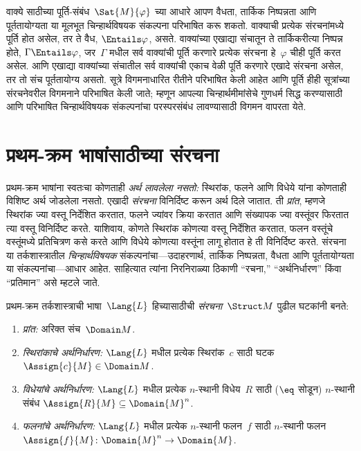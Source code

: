 वाक्ये साठीच्या पूर्ति-संबंध~$\Sat{M}{\varphi}$ च्या आधारे आपण वैधता,
तार्किक निष्पन्नता आणि पूर्ततायोग्यता या मूलभूत चिन्हार्थविषयक संकल्पना
परिभाषित करू शकतो. वाक्याची प्रत्येक संरचनांमध्ये पूर्ति
होत असेल, तर ते वैध, $\Entails \varphi$, असते. वाक्यांच्या एखाद्या
संचातून ते तार्किकरीत्या निष्पन्न होते, $\Gamma \Entails \varphi$, जर~$\Gamma$ मधील
सर्व वाक्यांची पूर्ति करणारे प्रत्येक संरचना हे~$\varphi$ चीही
पूर्ति करत असेल. आणि एखाद्या वाक्यांच्या संचातील सर्व
वाक्यांची एकाच वेळी पूर्ति करणारे एखादे संरचना असेल, तर तो
संच पूर्ततायोग्य असतो. सूत्रे विगमनाधारित रीतीने परिभाषित केली आहेत
आणि पूर्ति हीही सूत्रांच्या संरचनेवरील विगमनाने परिभाषित केली जाते;
म्हणून आपल्या चिन्हार्थमीमांसेचे गुणधर्म सिद्ध करण्यासाठी आणि परिभाषित
चिन्हार्थविषयक संकल्पनांचा परस्परसंबंध लावण्यासाठी विगमन वापरता येते.












\section{प्रथम-क्रम भाषांसाठीच्या संरचना}\label{fol:syn:str:sec}

\begin{explain}
प्रथम-क्रम भाषांना स्वतःचा कोणताही \emph{अर्थ लावलेला नसतो:}
स्थिरांक, फलने आणि विधेये यांना कोणताही विशिष्ट
अर्थ जोडलेला नसतो. एखादी \emph{संरचना}
विनिर्दिष्ट करून अर्थ दिले जातात. ती \emph{प्रांत}, म्हणजे
स्थिरांक ज्या वस्तू निर्देशित करतात, फलने ज्यांवर क्रिया
करतात आणि संख्यापक ज्या वस्तूंवर फिरतात त्या वस्तू विनिर्दिष्ट करते.
याशिवाय, कोणते स्थिरांक कोणत्या वस्तू निर्देशित करतात,
फलन वस्तूंचे वस्तूंमध्ये प्रतिचित्रण कसे करते आणि विधेये
कोणत्या वस्तूंना लागू होतात हे ती विनिर्दिष्ट करते. संरचना या
तर्कशास्त्रातील \emph{चिन्हार्थविषयक} संकल्पनांचा---उदाहरणार्थ, तार्किक
निष्पन्नता, वैधता आणि पूर्ततायोग्यता या संकल्पनांचा---आधार आहेत. साहित्यात त्यांना
निरनिराळ्या ठिकाणी ``रचना,'' ``अर्थनिर्धारण'' किंवा ``प्रतिमान'' असे
म्हटले जाते.
\end{explain}

\begin{defn}[संरचना]
प्रथम-क्रम तर्कशास्त्राची भाषा~$\Lang{L}$ हिच्यासाठीची
\emph{संरचना}~$\Struct M$ पुढील घटकांनी बनते:
\begin{enumerate}
\item \emph{प्रांत:} अरिक्त संच~$\Domain M$.
\item \emph{स्थिरांकाचे अर्थनिर्धारण:} $\Lang{L}$ मधील प्रत्येक
  स्थिरांक~$c$ साठी घटक~$\Assign{c}{M} \in \Domain M$.
\item \emph{विधेयांचे अर्थनिर्धारण:} $\Lang{L}$ मधील प्रत्येक
  $n$-स्थानी विधेय~$R$ साठी ($\eq$ सोडून) $n$-स्थानी संबंध
  $\Assign{R}{M} \subseteq \Domain{M}^n$.
\item \emph{फलनांचे अर्थनिर्धारण:} $\Lang{L}$ मधील प्रत्येक
  $n$-स्थानी फलन~$f$ साठी $n$-स्थानी फलन
  $\Assign{f}{M} \colon \Domain{M}^n \to \Domain{M}$.
\end{enumerate}
\end{defn}

